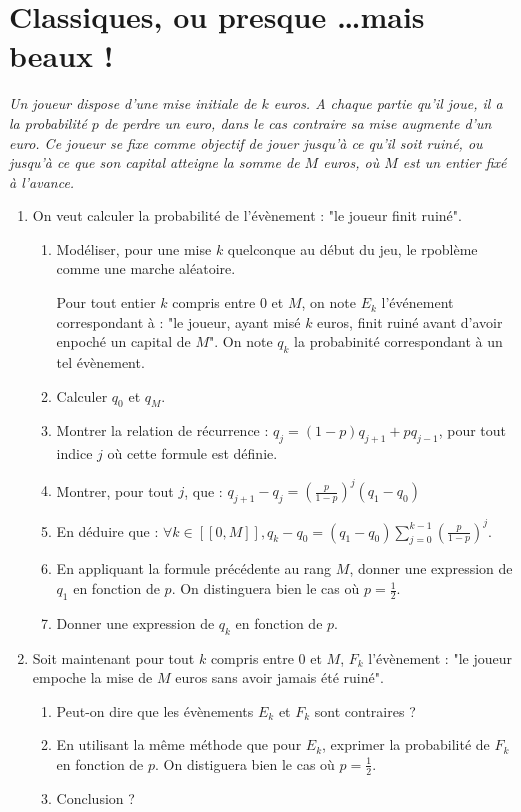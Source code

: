 \section{Classiques, ou presque \dots mais beaux !}

\begin{exer}
\textit{
Un joueur dispose d'une mise initiale de $k$ euros. %
A chaque partie qu'il joue, il a la probabilit\'e $p$ de perdre un euro, dans le cas contraire sa mise augmente d'un euro. %
Ce joueur se fixe comme objectif de jouer jusqu'\`a ce qu'il soit ruin\'e, ou jusqu'\`a ce que son capital atteigne la somme de $M$ euros, o\`u $M$ est un entier fix\'e \`a l'avance.
}
\ligneinter
\begin{enumerate}
\item On veut calculer la probabilit\'e de l'\'ev\`enement : "le joueur finit ruin\'e".
\begin{enumerate}
\item Mod\'eliser, pour une mise $k$ quelconque au d\'ebut du jeu, le rpobl\`eme comme une marche al\'eatoire.

\medskip
Pour tout entier $k$ compris entre $0$ et $M$, on note $E_k$ l'\'ev\'enement correspondant \`a : %
"le joueur, ayant mis\'e $k$ euros, finit ruin\'e avant d'avoir enpoch\'e un capital de $M$". On note $q_k$ la probabinit\'e correspondant \`a un tel \'ev\`enement.
\item Calculer $q_0$ et $q_M$.
\item Montrer la relation de r\'ecurrence : $q_j=(1-p)q_{j+1}+pq_{j-1}$, pour tout indice $j$ o\`u cette formule est d\'efinie.
\item Montrer, pour tout $j$, que : $q_{j+1}-q_j=\left(\frac{p}{1-p}\right)^j(q_1-q_0)$
\item En d\'eduire que : $\forall k \in [\![0,M]\!] , q_k-q_0=(q_1-q_0)\sum\limits_{j=0}^{k-1}\left(\frac{p}{1-p}\right)^j$.
\item En appliquant la formule pr\'ec\'edente au rang $M$, donner une expression de $q_1$ en fonction de $p$. %
On distinguera bien le cas o\`u $p=\frac{1}{2}$.
\item Donner une expression de $q_k$ en fonction de $p$.
\end{enumerate}
\item Soit maintenant pour tout $k$ compris entre $0$ et $M$, $F_k$ l'\'ev\`enement : "le joueur empoche la mise de $M$ euros sans avoir jamais \'et\'e ruin\'e".
\begin{enumerate}
\item Peut-on dire que les \'ev\`enements $E_k$ et $F_k$ sont contraires ?
\item En utilisant la m\^eme m\'ethode que pour $E_k$, exprimer la probabilit\'e de $F_k$ en fonction de $p$. On distiguera bien le cas o\`u $p=\frac{1}{2}$.
\item Conclusion ?
\end{enumerate}
\end{enumerate}
\end{exer}

